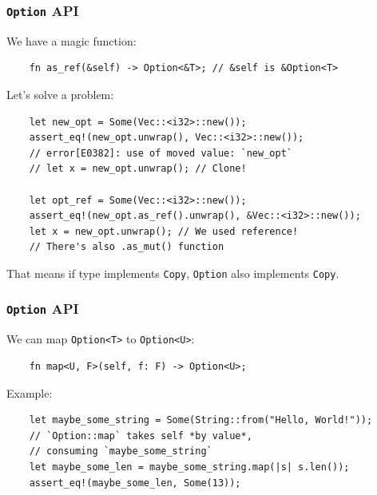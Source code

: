 \documentclass[aspectratio=1610,t]{beamer}
\begin{document}
\begin{frame}[fragile]
\frametitle{\texttt{Option} API}
We have a magic function: \begin{verbatim}
    fn as_ref(&self) -> Option<&T>; // &self is &Option<T>
\end{verbatim}

Let's solve a problem:

\begin{verbatim}
    let new_opt = Some(Vec::<i32>::new());
    assert_eq!(new_opt.unwrap(), Vec::<i32>::new());
    // error[E0382]: use of moved value: `new_opt`
    // let x = new_opt.unwrap(); // Clone!

    let opt_ref = Some(Vec::<i32>::new());
    assert_eq!(new_opt.as_ref().unwrap(), &Vec::<i32>::new());
    let x = new_opt.unwrap(); // We used reference!
    // There's also .as_mut() function
\end{verbatim}

That means if type implements \texttt{Copy}, \texttt{Option} also implements \texttt{Copy}.
\end{frame}
 

\begin{frame}[fragile]
\frametitle{\texttt{Option} API}
We can map \texttt{Option<T>} to \texttt{Option<U>}:

\begin{verbatim}
    fn map<U, F>(self, f: F) -> Option<U>;
\end{verbatim}

Example:

\begin{verbatim}
    let maybe_some_string = Some(String::from("Hello, World!"));
    // `Option::map` takes self *by value*,
    // consuming `maybe_some_string`
    let maybe_some_len = maybe_some_string.map(|s| s.len());
    assert_eq!(maybe_some_len, Some(13));
\end{verbatim}
\end{frame}

\end{document}
